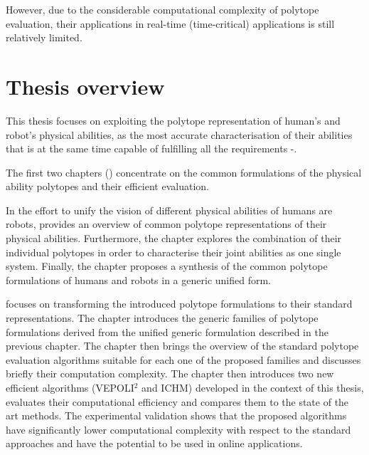However, due to the considerable computational complexity of polytope evaluation, their applications in real-time (time-critical) applications is still relatively limited. 

\section{Thesis overview}

This thesis focuses on exploiting the polytope representation of human's and robot's physical abilities, as the most accurate characterisation of their abilities that is at the same time capable of fulfilling all the requirements -. 

The first two chapters () concentrate on the common formulations of the physical ability polytopes and their efficient evaluation.

In the effort to unify the vision of different physical abilities of humans are robots,  provides an overview of common polytope representations of their physical abilities. Furthermore, the chapter explores the combination of their individual polytopes in order to characterise their joint abilities as one single system.
Finally, the chapter proposes a synthesis of the common polytope formulations of humans and robots in a generic unified form.



 focuses on transforming the introduced polytope formulations to their standard representations. The chapter introduces the generic families of polytope formulations derived from the unified generic formulation described in the previous chapter. The chapter then brings the overview of the standard polytope evaluation algorithms suitable for each one of the proposed families and discusses briefly their computation complexity. The chapter then introduces two new efficient algorithms (VEPOLI$^2$ and ICHM) developed in the context of this thesis, evaluates their computational efficiency and compares them to the state of the art methods. The experimental validation shows that the proposed algorithms have significantly lower computational complexity with respect to the standard approaches and have the potential to be used in online applications.  


